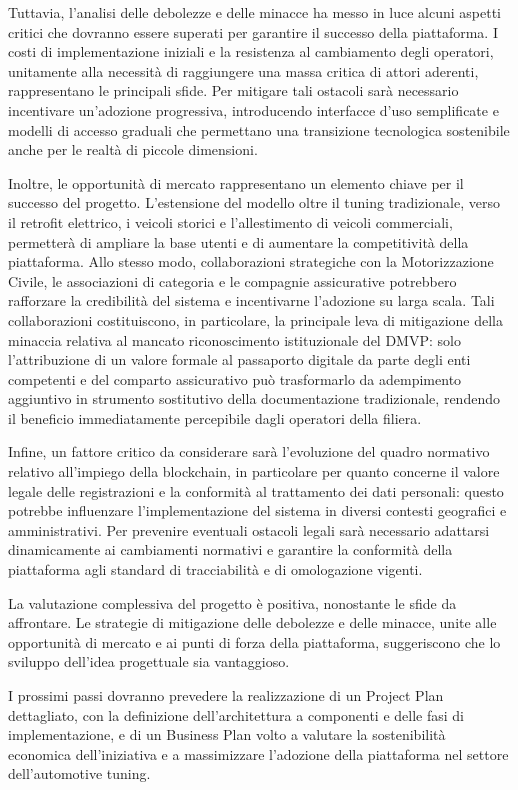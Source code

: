 Tuttavia, l'analisi delle debolezze e delle minacce ha messo in luce alcuni aspetti critici che dovranno essere superati per garantire il successo della piattaforma. I costi di implementazione iniziali e la resistenza al cambiamento degli operatori, unitamente alla necessità di raggiungere una massa critica di attori aderenti, rappresentano le principali sfide. Per mitigare tali ostacoli sarà necessario incentivare un'adozione progressiva, introducendo interfacce d'uso semplificate e modelli di accesso graduali che permettano una transizione tecnologica sostenibile anche per le realtà di piccole dimensioni.

Inoltre, le opportunità di mercato rappresentano un elemento chiave per il successo del progetto. L'estensione del modello oltre il tuning tradizionale, verso il retrofit elettrico, i veicoli storici e l'allestimento di veicoli commerciali, permetterà di ampliare la base utenti e di aumentare la competitività della piattaforma. Allo stesso modo, collaborazioni strategiche con la Motorizzazione Civile, le associazioni di categoria e le compagnie assicurative potrebbero rafforzare la credibilità del sistema e incentivarne l'adozione su larga scala. Tali collaborazioni costituiscono, in particolare, la principale leva di mitigazione della minaccia relativa al mancato riconoscimento istituzionale del DMVP: solo l'attribuzione di un valore formale al passaporto digitale da parte degli enti competenti e del comparto assicurativo può trasformarlo da adempimento aggiuntivo in strumento sostitutivo della documentazione tradizionale, rendendo il beneficio immediatamente percepibile dagli operatori della filiera.

Infine, un fattore critico da considerare sarà l'evoluzione del quadro normativo relativo all'impiego della blockchain, in particolare per quanto concerne il valore legale delle registrazioni e la conformità al trattamento dei dati personali: questo potrebbe influenzare l'implementazione del sistema in diversi contesti geografici e amministrativi. Per prevenire eventuali ostacoli legali sarà necessario adattarsi dinamicamente ai cambiamenti normativi e garantire la conformità della piattaforma agli standard di tracciabilità e di omologazione vigenti.

La valutazione complessiva del progetto è positiva, nonostante le sfide da affrontare. Le strategie di mitigazione delle debolezze e delle minacce, unite alle opportunità di mercato e ai punti di forza della piattaforma, suggeriscono che lo sviluppo dell'idea progettuale sia vantaggioso.

I prossimi passi dovranno prevedere la realizzazione di un Project Plan dettagliato, con la definizione dell'architettura a componenti e delle fasi di implementazione, e di un Business Plan volto a valutare la sostenibilità economica dell'iniziativa e a massimizzare l'adozione della piattaforma nel settore dell'automotive tuning.